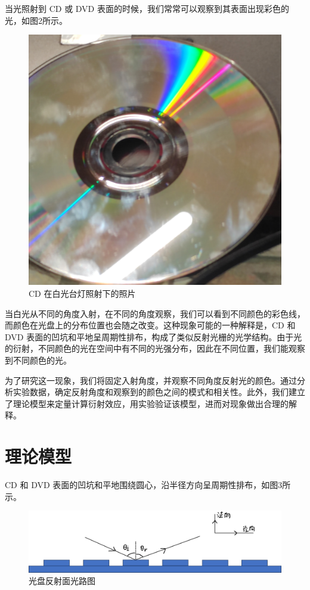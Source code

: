 \documentclass[fontset=windows]{article}
\begin{document}
当光照射到 CD 或 DVD 表面的时候，我们常常可以观察到其表面出现彩色的光，如图2所示。

\begin{figure}[htbp]
	\centering
	\includegraphics[scale=0.05]{lines.jpg}
	\caption{CD 在白光台灯照射下的照片}
	\label{2}
\end{figure}

当白光从不同的角度入射，在不同的角度观察，我们可以看到不同颜色的彩色线，而颜色在光盘上的分布位置也会随之改变。这种现象可能的一种解释是，CD 和 DVD 表面的凹坑和平地呈周期性排布，构成了类似反射光栅的光学结构。由于光的衍射，不同颜色的光在空间中有不同的光强分布，因此在不同位置，我们能观察到不同颜色的光。

为了研究这一现象，我们将固定入射角度，并观察不同角度反射光的颜色。通过分析实验数据，确定反射角度和观察到的颜色之间的模式和相关性。此外，我们建立了理论模型来定量计算衍射效应，用实验验证该模型，进而对现象做出合理的解释。

\section{理论模型}

CD 和 DVD 表面的凹坑和平地围绕圆心，沿半径方向呈周期性排布，如图3所示。

\begin{figure}[htbp]
	\centering
	\includegraphics[scale=0.5]{2.png}
	\caption{光盘反射面光路图}
	\label{3}
\end{figure}
\end{document}
